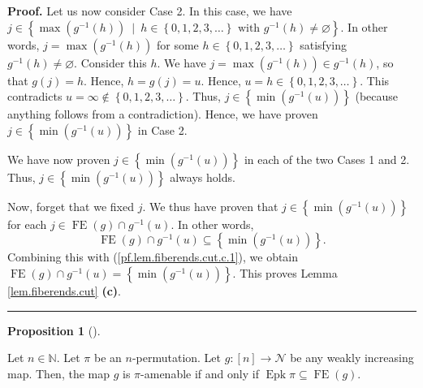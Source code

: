 \documentclass[numbers=enddot,12pt,final,onecolumn,notitlepage]{scrartcl}%
\theoremstyle{definition}
\newtheorem{prop}[theo]{Proposition}
\newenvironment{proposition}[1][]
{\begin{prop}[#1]\begin{leftbar}}
{\end{leftbar}\end{prop}}
\newenvironment{proof}[1][Proof]{\noindent\textbf{#1.} }{\ \rule{0.5em}{0.5em}}
\newenvironment{verlong}{}{}
\begin{document}
\begin{verlong}
\begin{proof}
Let us now consider Case 2. In this case, we have \newline$j\in\left\{
\max\left(  g^{-1}\left(  h\right)  \right)  \ \mid\ h\in\left\{
0,1,2,3,\ldots\right\}  \text{ with }g^{-1}\left(  h\right)  \neq
\varnothing\right\}  $. In other words, $j=\max\left(  g^{-1}\left(  h\right)
\right)  $ for some $h\in\left\{  0,1,2,3,\ldots\right\}  $ satisfying
$g^{-1}\left(  h\right)  \neq\varnothing$. Consider this $h$. We have
$j=\max\left(  g^{-1}\left(  h\right)  \right)  \in g^{-1}\left(  h\right)  $,
so that $g\left(  j\right)  =h$. Hence, $h=g\left(  j\right)  =u$. Hence,
$u=h\in\left\{  0,1,2,3,\ldots\right\}  $. This contradicts $u=\infty
\notin\left\{  0,1,2,3,\ldots\right\}  $. Thus, $j\in\left\{  \min\left(
g^{-1}\left(  u\right)  \right)  \right\}  $ (because anything follows from a
contradiction). Hence, we have proven $j\in\left\{  \min\left(  g^{-1}\left(
u\right)  \right)  \right\}  $ in Case 2.

We have now proven $j\in\left\{  \min\left(  g^{-1}\left(  u\right)  \right)
\right\}  $ in each of the two Cases 1 and 2. Thus, $j\in\left\{  \min\left(
g^{-1}\left(  u\right)  \right)  \right\}  $ always holds.

Now, forget that we fixed $j$. We thus have proven that $j\in\left\{
\min\left(  g^{-1}\left(  u\right)  \right)  \right\}  $ for each
$j\in\operatorname*{FE}\left(  g\right)  \cap g^{-1}\left(  u\right)  $. In
other words,%
\[
\operatorname*{FE}\left(  g\right)  \cap g^{-1}\left(  u\right)
\subseteq\left\{  \min\left(  g^{-1}\left(  u\right)  \right)  \right\}  .
\]
Combining this with (\ref{pf.lem.fiberends.cut.c.1}), we obtain
$\operatorname*{FE}\left(  g\right)  \cap g^{-1}\left(  u\right)  =\left\{
\min\left(  g^{-1}\left(  u\right)  \right)  \right\}  $. This proves Lemma
\ref{lem.fiberends.cut} \textbf{(c)}.
\end{proof}
\end{verlong}

\begin{proposition}
\label{prop.Epk.fiberends}Let $n\in\mathbb{N}$.
Let $\pi$ be an $n$-permutation.
Let $g:\left[  n\right]
\rightarrow\mathcal{N}$ be any weakly increasing map. Then, the map $g$ is
$\pi$-amenable if and only if $\operatorname{Epk}\pi\subseteq
\operatorname*{FE}\left(  g\right)  $.
\end{proposition}
\end{document}
